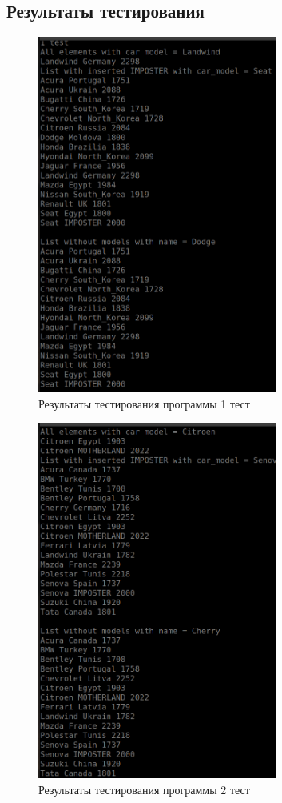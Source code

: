 \documentclass[a4paper, 14pt]{extarticle}
\begin{document}
\subsection{Результаты тестирования}
\begin{figure}[htpb]
  \centering
  \includegraphics[width=0.7\textwidth]{pictures/first_test.png}
  \caption{Результаты тестирования программы 1 тест}
  \label{fig:test1}
\end{figure}
\newpage
\begin{figure}[htpb]
  \centering
  \includegraphics[width=0.7\textwidth]{pictures/second_test.png}
  \caption{Результаты тестирования программы 2 тест}
  \label{fig:test2}
\end{figure}
\end{document}

